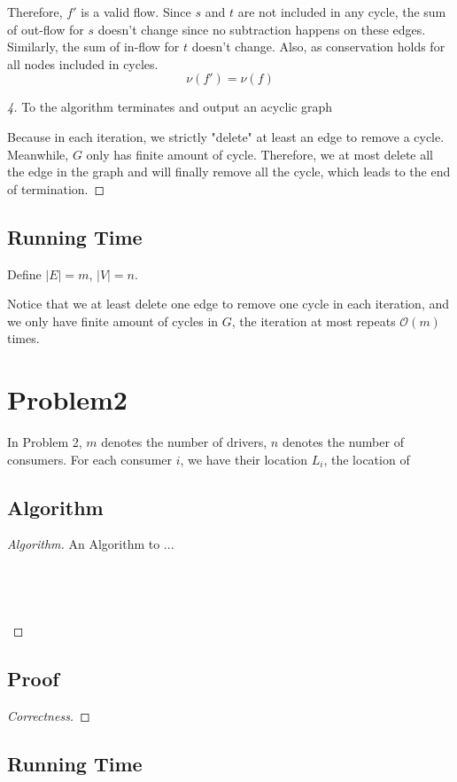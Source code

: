 \documentclass[openany]{article}
\begin{document}
Therefore, $f'$ is a valid flow. Since $s$ and $t$ are not included in any cycle, the sum of out-flow for $s$ doesn't change since no subtraction happens on these edges. Similarly, the sum of in-flow for $t$ doesn't change. Also, as conservation holds for all nodes included in cycles.
\[\nu(f') = \nu(f)\]

\begin{proof}[4]{To the algorithm terminates and output an acyclic graph}

Because in each iteration, we strictly "delete" at least an edge to remove a cycle. Meanwhile, $G$ only has finite amount of cycle. Therefore, we at most delete all the edge in the graph and will finally remove all the cycle, which leads to the end of termination.
    
\end{proof}

\subsection*{Running Time}
Define $|E| = m$, $|V| = n$.

Notice that we at least delete one edge to remove one cycle in each iteration, and we only have finite amount of cycles in $G$, the iteration at most repeats $\mathcal{O}(m)$ times. 

\section*{Problem2}
In Problem 2, $m$ denotes the number of drivers, $n$ denotes the number of consumers. For each consumer $i$, we have their location $L_i$, the location of 
\subsection*{Algorithm}
\begin{proof}[Algorithm]{}
		\renewcommand{\qedsymbol}{}
		An Algorithm to ...
		\begin{lstlisting}[basicstyle=\fontsize{8}{9}\selectfont\ttfamily]


        
		\end{lstlisting} 
\end{proof}

\subsection*{Proof}
\begin{proof}[Correctness]{}

\end{proof}

\subsection*{Running Time}
\end{document}
